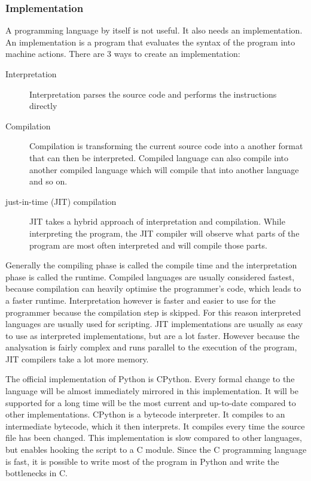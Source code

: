 \subsubsection{Implementation}

A programming language by itself is not useful. It also needs an implementation.
An implementation is a program that evaluates the syntax of the program into
machine actions. There are 3 ways to create an implementation:
\begin{description}
  \item[Interpretation] Interpretation parses the source code and performs the
  instructions directly
  \item[Compilation] Compilation is transforming the current source code into a
  another format that can then be interpreted. Compiled language can also
  compile into another compiled language which will compile that into another
  language and so on.
  \item[just-in-time (JIT) compilation] JIT takes a hybrid approach of
  interpretation and compilation. While interpreting the program, the JIT
  compiler will observe what parts of the program are most often interpreted and
  will compile those parts.
\end{description}
Generally the compiling phase is called the compile time and the interpretation
phase is called the runtime. Compiled languages are usually considered fastest,
because compilation can heavily optimise the programmer's code, which leads to
a faster runtime. Interpretation however is faster and easier to use for the
programmer because the compilation step is skipped. For this reason interpreted
languages are usually used for scripting. JIT implementations are usually as easy to use as interpreted implementations, but
are a lot faster. However because the analysation is fairly complex and runs
parallel to the execution of the program, JIT compilers take a lot more
memory.\cite{website:jit-memory}

The official implementation of Python is CPython. Every formal change to the
language will be almost immediately mirrored in this implementation. It will be
supported for a long time will be the most current and up-to-date compared to
other implementations. CPython is a bytecode interpreter. It compiles to an
intermediate bytecode, which it then interprets. It compiles every time the
source file has been changed. This implementation is slow compared to
other languages\cite{website:python-speed}, but enables hooking the script to a
C module. Since the C programming language is fast,\cite{website:c-vs-python} it
is possible to write most of the program in Python and write the bottlenecks in
C.

